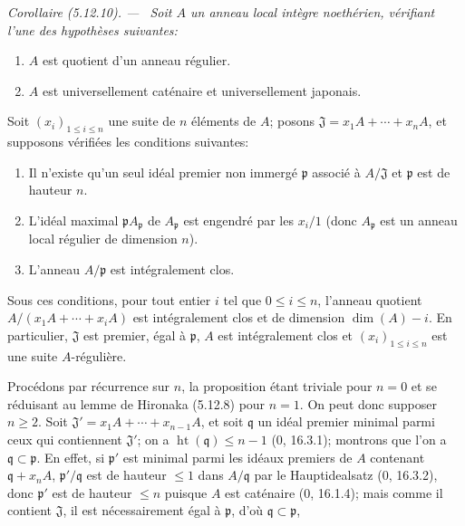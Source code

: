 \documentclass[10pt,oneside]{book}
\newcommand{\oldpage}[2][]{%
  \setcounter{footnote}{0}%
  \marginpar{\scriptsize\textbf{#1}~|~#2}\ignorespaces}
\newenvironment{corollary}[1][]{%
  \par\medskip\noindent\itshape Corollaire (#1). ---\ }{\par}
\begin{document}
\begin{corollary}[5.12.10]
\label{IV.2.s5.12.10-fr}
Soit $A$ un anneau local intègre noethérien, vérifiant l'une des hypothèses
suivantes:
\begin{enumerate}
\item[a)] $A$ est quotient d'un anneau régulier.
\item[b)] $A$ est universellement caténaire et universellement japonais.
\end{enumerate}
Soit $(x_i)_{1\leq i\leq n}$ une suite de $n$ éléments de $A$; posons
$\mathfrak J=x_1A+\cdots+x_nA$, et supposons vérifiées les conditions
suivantes:
\begin{enumerate}
\item[(i)] Il n'existe qu'un seul idéal premier non immergé $\mathfrak p$
associé à $A/\mathfrak J$ et $\mathfrak p$ est de hauteur $n$.
\item[(ii)] L'idéal maximal $\mathfrak pA_{\mathfrak p}$ de $A_{\mathfrak p}$
est engendré par les $x_i/1$ (donc $A_{\mathfrak p}$ est un anneau local
régulier de dimension $n$).
\item[(iii)] L'anneau $A/\mathfrak p$ est intégralement clos.
\end{enumerate}
Sous ces conditions, pour tout entier $i$ tel que $0\leq i\leq n$, l'anneau
quotient $A/(x_1A+\cdots+x_iA)$ est intégralement clos et de dimension
$\dim(A)-i$. En particulier, $\mathfrak J$ est premier, égal à $\mathfrak p$,
$A$ est intégralement clos et $(x_i)_{1\leq i\leq n}$ est une suite
$A$-régulière.
\end{corollary}

Procédons par récurrence sur $n$, la proposition étant triviale pour $n=0$ et
se réduisant au lemme de Hironaka (5.12.8) pour $n=1$. On peut donc supposer
$n\geq2$. Soit $\mathfrak J'=x_1A+\cdots+x_{n-1}A$, et soit $\mathfrak q$ un
idéal premier minimal parmi ceux qui contiennent $\mathfrak J'$; on a
$\operatorname{ht}(\mathfrak q)\leq n-1$ (0, 16.3.1); montrons que l'on a
$\mathfrak q\subset\mathfrak p$. En effet, si $\mathfrak p'$ est minimal parmi
les idéaux premiers de $A$ contenant $\mathfrak q+x_nA$,
$\mathfrak p'/\mathfrak q$ est de hauteur $\leq1$ dans $A/\mathfrak q$ par le
Hauptidealsatz (0, 16.3.2), donc $\mathfrak p'$ est de hauteur $\leq n$ puisque
$A$ est caténaire (0, 16.1.4); mais comme il contient $\mathfrak J$, il est
nécessairement égal à $\mathfrak p$, d'où
$\mathfrak q\subset\mathfrak p$,

\oldpage[IV-2]{131}
\end{document}
